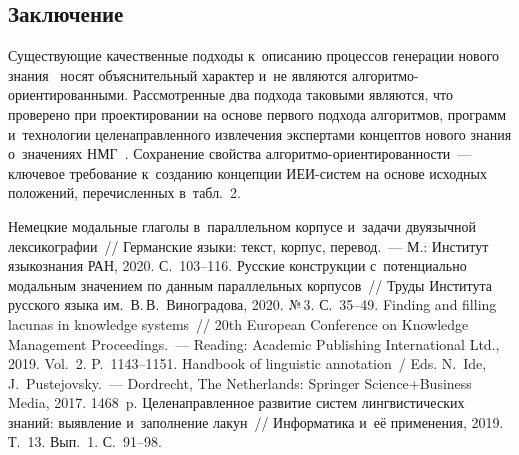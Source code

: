\begin{multicols}{2}
\section{Заключение}

  Существующие качественные подходы к~описанию процессов генерации 
нового знания~\cite{24-z} носят объяснительный характер и~не являются 
ал\-го\-рит\-мо-ори\-ен\-ти\-ро\-ван\-ны\-ми. Рассмотренные два подхода таковыми 
являются, что проверено при проектировании на основе первого подхода 
алгоритмов, программ и~технологии целенаправленного извлечения 
экспертами концептов нового знания о~значениях НМГ~\cite{3-z, 5-z, 6-z}. 
Сохранение свойства ал\-го\-рит\-мо-ори\-ен\-ти\-ро\-ван\-ности~--- ключевое 
требование к~созданию концепции ИЕИ-сис\-тем на основе исходных 
положений, перечисленных в~табл.~2.
  
{\small\frenchspacing
{%
\begin{thebibliography}{99}
 Немецкие модальные глаголы в~параллельном корпусе и~задачи 
двуязычной лексикографии~// Германские языки: текст, корпус, перевод.~--- М.: Институт 
языкознания РАН, 2020. С.~103--116.
 Русские конструкции с~потенциально 
модальным значением по данным параллельных корпусов~// Труды Института русского 
языка им.\ В.\,В.~Виноградова, 2020. №\,3. С.~35--49.
 Finding and filling lacunas in knowledge systems~// 20th European Conference 
on Knowledge Management Proceedings.~--- Reading: Academic Publishing International Ltd., 
2019. Vol.~2. P.~1143--1151.
Handbook of linguistic annotation~/ Eds. N.~Ide, J.~Pustejovsky.~--- Dordrecht, The 
Netherlands: Springer Science\;+\;Business Media, 2017. 1468~p.
 Целенаправленное развитие систем лингвистических знаний: 
выявление и~заполнение лакун~// Информатика и~её применения, 2019. Т.~13. Вып.~1. 
С.~91--98.

\columnbreak


\end{thebibliography}}}
\end{multicols}

